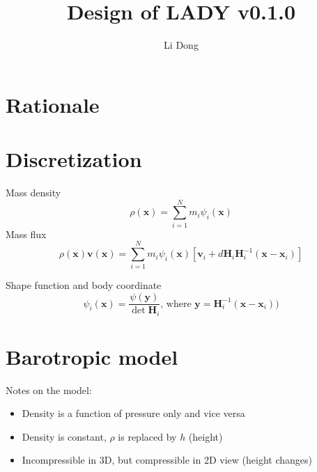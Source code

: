 \documentclass[slidestop,compress,mathserif]{beamer}
\title{Design of LADY v0.1.0}
\author{Li Dong}
\begin{document}
\begin{frame}
  \titlepage
\end{frame}

\section{Rationale}
\label{sec:Rationale}

\begin{frame}

\end{frame}

\section{Discretization}
\label{sec:Discretization}

\begin{frame}
  Mass density
  \begin{equation}
    \rho(\mathbf{x}) = \sum_{i = 1}^{N} m_i \psi_i(\mathbf{x})
  \end{equation}
  Mass flux
  \begin{equation}
    \rho(\mathbf{x}) \mathbf{v}(\mathbf{x}) = \sum_{i = 1}^{N} m_i \psi_i(\mathbf{x}) \left[ \mathbf{v}_i + d\mathbf{H}_i \mathbf{H}_i^{-1}(\mathbf{x} - \mathbf{x}_i) \right]
  \end{equation}
  \begin{exampleblock}{Shape function and body coordinate}
    \begin{equation*}
      \psi_i(\mathbf{x}) = \frac{\psi(\mathbf{y})}{\det{\mathbf{H}}_i}\text{, where }\mathbf{y} = \mathbf{H}_i^{-1}(\mathbf{x} - \mathbf{x}_i))
    \end{equation*}
  \end{exampleblock}
\end{frame}

\section{Barotropic model}
\label{sec:Barotropic model}

\begin{frame}
  Notes on the model:
  \begin{itemize}
    \item Density is a function of pressure only and vice versa

    \item Density is constant, $\rho$ is replaced by $h$ (height)
    \item Incompressible in 3D, but compressible in 2D view (height changes)
  \end{itemize}
\end{frame}
\end{document}
